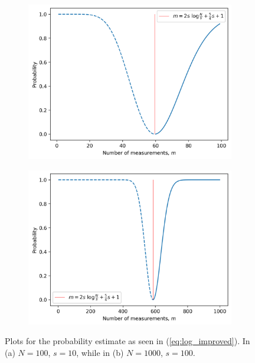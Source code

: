 \begin{figure}
    \begin{subfigure}{0.5\textwidth}
        \includegraphics[width=\linewidth]{pictures/log_proba100}
        \caption{}
    \end{subfigure}
    \begin{subfigure}{0.5\textwidth}
        \includegraphics[width=\linewidth]{pictures/log_proba1000}
        \caption{}
    \end{subfigure}
    \caption{\centering Plots for the probability estimate as seen in (\ref{eq:log_improved}).
    In (a) $N=100$, $s=10$, while in (b) $N=1000$, $s=100$.}
    \label{fig:log-proba}
\end{figure}

